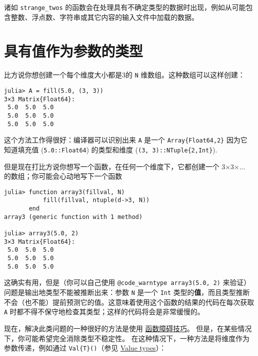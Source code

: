 诸如 \texttt{strange\_twos} 的函数会在处理具有不确定类型的数据时出现，例如从可能包含整数、浮点数、字符串或其它内容的输入文件中加载的数据。



\hypertarget{13298146121388666827}{}


\section{具有值作为参数的类型}



比方说你想创建一个每个维度大小都是3的 \texttt{N} 维数组。这种数组可以这样创建：




\begin{verbatim}
julia> A = fill(5.0, (3, 3))
3×3 Matrix{Float64}:
 5.0  5.0  5.0
 5.0  5.0  5.0
 5.0  5.0  5.0
\end{verbatim}



这个方法工作得很好：编译器可以识别出来 \texttt{A} 是一个 \texttt{Array\{Float64,2\}} 因为它知道填充值 (\texttt{5.0::Float64}) 的类型和维度 (\texttt{(3, 3)::NTuple\{2,Int\}}).



但是现在打比方说你想写一个函数，在任何一个维度下，它都创建一个 3×3×... 的数组；你可能会心动地写下一个函数




\begin{verbatim}
julia> function array3(fillval, N)
           fill(fillval, ntuple(d->3, N))
       end
array3 (generic function with 1 method)

julia> array3(5.0, 2)
3×3 Matrix{Float64}:
 5.0  5.0  5.0
 5.0  5.0  5.0
 5.0  5.0  5.0
\end{verbatim}



这确实有用，但是（你可以自己使用 \texttt{@code\_warntype array3(5.0, 2)} 来验证）问题是输出地类型不能被推断出来：参数 \texttt{N} 是一个 \texttt{Int} 类型的\textbf{值}，而且类型推断不会（也不能）提前预测它的值。这意味着使用这个函数的结果的代码在每次获取 \texttt{A} 时都不得不保守地检查其类型；这样的代码将会是非常缓慢的。



现在，解决此类问题的一种很好的方法是使用 \hyperlink{17509985600836810807}{函数障碍技巧}。 但是，在某些情况下，你可能希望完全消除类型不稳定性。 在这种情况下，一种方法是将维度作为参数传递，例如通过 \texttt{Val\{T\}()}（参见 \href{@ref}{{\textquotedbl}Value types{\textquotedbl}}）：




